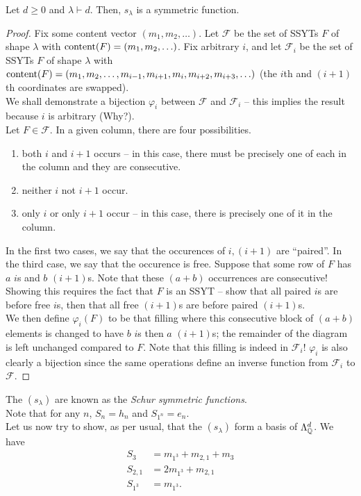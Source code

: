 	\begin{ftheo}
		Let $d \ge 0$ and $\lambda \vdash d$. Then, $s_\lambda$ is a symmetric function.
	\end{ftheo}
	\begin{proof}
		Fix some content vector $(m_1,m_2,\ldots)$. Let $\mathcal{F}$ be the set of SSYTs $F$ of shape $\lambda$ with $\operatorname{content}(F) = (m_1,m_2,\ldots)$. Fix arbitrary $i$, and let $\mathcal{F}_i$ be the set of SSYTs $F$ of shape $\lambda$ with $\operatorname{content}(F) = (m_1,m_2,\ldots,m_{i-1},m_{i+1},m_i,m_{i+2},m_{i+3},\ldots)$ (the $i$th and $(i+1)$th coordinates are swapped).\\
		We shall demonstrate a bijection $\varphi_i$ between $\mathcal{F}$ and $\mathcal{F}_i$ -- this implies the result because $i$ is arbitrary (Why?).\\
		Let $F \in \mathcal{F}$. In a given column, there are four possibilities.
		\begin{enumerate}
			\item both $i$ and $i+1$ occurs -- in this case, there must be precisely one of each in the column and they are consecutive.
			\item neither $i$ not $i+1$ occur.
			\item only $i$ or only $i+1$ occur -- in this case, there is precisely one of it in the column.
		\end{enumerate}
		In the first two cases, we say that the occurences of $i,(i+1)$ are ``paired''. In the third case, we say that the occurence is free. Suppose that some row of $F$ has $a$ $i$s and $b$ $(i+1)$s. Note that these $(a+b)$ occurrences are consecutive! Showing this requires the fact that $F$ is an SSYT -- show that all paired $i$s are before free $i$s, then that all free $(i+1)$s are before paired $(i+1)$s.\\
		We then define $\varphi_i(F)$ to be that filling where this consecutive block of $(a+b)$ elements is changed to have $b$ $i$s then $a$ $(i+1)$s; the remainder of the diagram is left unchanged compared to $F$. Note that this filling is indeed in $\mathcal{F}_i$! $\varphi_i$ is also clearly a bijection since the same operations define an inverse function from $\mathcal{F}_i$ to $\mathcal{F}$.
	\end{proof}

	The $(s_\lambda)$ are known as the \emph{Schur symmetric functions}.\\
	Note that for any $n$, $S_n = h_n$ and $S_{1^n} = e_n$.\\
	Let us now try to show, as per usual, that the $(s_\lambda)$ form a basis of $\Lambda_{\mathbb{Q}}^d$. We have
	\begin{align*}
		S_3 &= m_{1^3} + m_{2,1} + m_3 \\
		S_{2,1} &= 2m_{1^3} + m_{2,1} \\
		S_{1^3} &= m_{1^3}.
	\end{align*}

